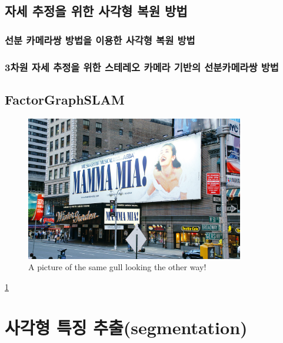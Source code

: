 \documentclass[master,korean,final]{cbnu-ecs}
\begin{document}
\section{자세 추정을 위한 사각형 복원 방법}
\cite{Guerrero2008}%
\cite{Nister2005}%

\cite{Lee2012,Lee2013}
\cite{Lee2014}
\subsection{선분 카메라쌍 방법을 이용한 사각형 복원 방법}
\subsection{3차원 자세 추정을 위한 스테레오 카메라 기반의 선분카메라쌍 방법}
\section{FactorGraphSLAM}
\cite{Dellaert2006}%
\cite{Kaess2007}%
\cite{Kaess2011}%

\begin{figure}[!ht]
  \centering
	\includegraphics[width=360px]{img/BroadwayPlayers_01.jpg}
  \caption{A picture of the same gull looking the other way!}
\label{dldl}
\end{figure}
\ref{dldl}
\chapter{사각형 특징 추출(segmentation)}
\cite{Zhang2003}%
\cite{Han2009}%
\cite{Wildenauer2008}%
\cite{Jung2004}%
\cite{Bazin2007}%
\cite{Bhaskar2010}%
\end{document}
